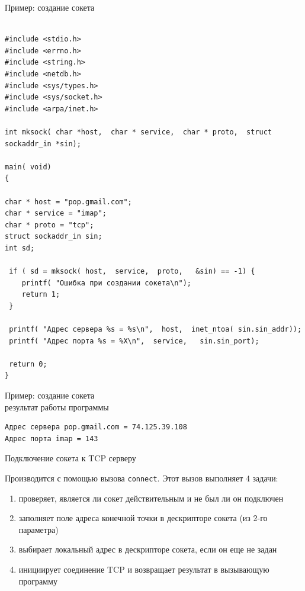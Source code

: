 \begin{frame}[fragile]{Пример: создание сокета}
\tiny
	\begin{lstlisting}

#include <stdio.h>
#include <errno.h>
#include <string.h>
#include <netdb.h>
#include <sys/types.h>
#include <sys/socket.h>
#include <arpa/inet.h>

int mksock( char *host,  char * service,  char * proto,  struct sockaddr_in *sin);

main( void)
{

char * host = "pop.gmail.com";
char * service = "imap";
char * proto = "tcp";
struct sockaddr_in sin;
int sd;

 if ( sd = mksock( host,  service,  proto,   &sin) == -1) {
    printf( "Ошибка при создании сокета\n");
    return 1;
 }

 printf( "Адрес сервера %s = %s\n",  host,  inet_ntoa( sin.sin_addr));
 printf( "Адрес порта %s = %X\n",  service,   sin.sin_port);
 
 return 0;
}

	\end{lstlisting}
\normalsize
\end{frame}


\begin{frame}[fragile]{Пример: создание сокета\\результат работы программы}
\scriptsize
	\begin{verbatim}
Адрес сервера pop.gmail.com = 74.125.39.108
Адрес порта imap = 143
	\end{verbatim}
\normalsize
\end{frame}


\begin{frame}{Подключение сокета к TCP серверу}

	Производится с помощью вызова {\tt connect}. Этот вызов выполняет 4 задачи:
	\begin{enumerate}
		\item проверяет,  является ли сокет действительным и не был ли он подключен
		\item заполняет поле адреса конечной точки в дескрипторе сокета (из 2-го параметра)
		\item выбирает локальный адрес в дескрипторе сокета,  если он еще не задан
		\item инициирует соединение TCP и возвращает результат в вызывающую программу
	\end{enumerate}
\end{frame}

